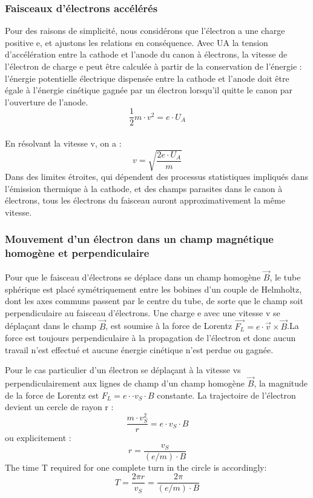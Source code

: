 \documentclass[../main.tex]{subfiles}
\begin{document}
\subsubsection{Faisceaux d'électrons accélérés}
Pour des raisons de simplicité, nous considérons que l'électron a une charge positive e, et ajustons les relations en conséquence. Avec UA la tension d'accélération entre la cathode et l'anode du canon à électrons, la vitesse de l'électron de charge e peut être calculée à partir de la conservation de l'énergie : l'énergie potentielle électrique dispensée entre la cathode et l'anode doit être égale à l'énergie cinétique gagnée par un électron lorsqu'il quitte le canon par l'ouverture de l'anode.\\
$$\frac{1}{2}m \cdot v^2 = e \cdot U_A$$\\
En résolvant la vitesse v, on a : \\
$$v = \sqrt{\frac{2e \cdot U_A}{m}}$$
Dans des limites étroites, qui dépendent des processus statistiques impliqués dans l'émission thermique à la cathode, et des champs parasites dans le canon à électrons, tous les électrons du faisceau auront approximativement la même vitesse. 
\subsubsection{ Mouvement d'un électron dans un champ magnétique homogène et perpendiculaire}
Pour que le faisceau d'électrons se déplace dans un champ homogène $\overrightarrow{B}$, le tube sphérique est placé symétriquement entre les bobines d'un couple de Helmholtz, dont les axes communs passent par le centre du tube, de sorte que le champ soit perpendiculaire au faisceau d'électrons. Une charge e avec une vitesse v se déplaçant dans le champ $\overrightarrow{B}$, est soumise à la force de Lorentz $\overrightarrow{F_L} = e \cdot \overrightarrow{v} \times \overrightarrow{B}$.La force est toujours perpendiculaire à la propagation de l'électron et donc aucun travail n'est effectué et aucune énergie cinétique n'est perdue ou gagnée.\\
\par 
Pour le cas particulier d'un électron se déplaçant à la vitesse vs perpendiculairement aux lignes de champ d'un champ homogène $\overrightarrow{B}$, la magnitude de la force de Lorentz est $F_L = e \cdot \cdot v_S \cdot B$ constante. La trajectoire de l'électron devient un cercle de rayon r :
$$\frac{m \cdot v_S^2}{r} = e \cdot v_S \cdot B$$
ou explicitement : \\
$$r = \frac{v_S}{(e/m) \cdot B}$$
The time T required for one complete turn in the circle is accordingly:
$$T = \frac{2 \pi r}{v_S} = \frac{2 \pi}{(e/m) \cdot B}$$
\end{document}
